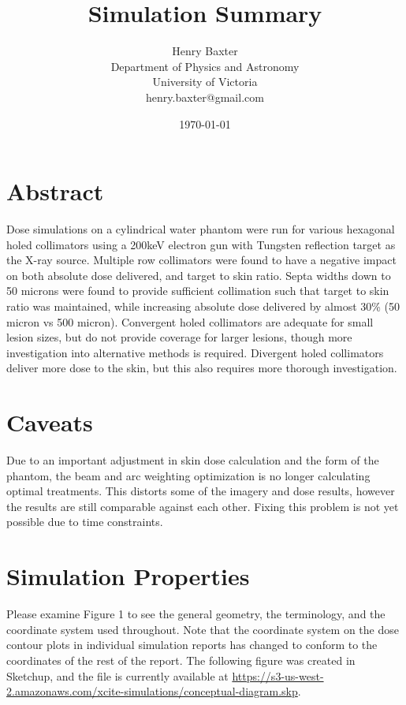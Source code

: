 \documentclass[12pt]{article}
\title{Simulation Summary}
\author{
        Henry Baxter \\
                Department of Physics and Astronomy\\
        University of Victoria\\
        henry.baxter@gmail.com
}
\date{\today}
\begin{document}
\maketitle

\section*{Abstract}

Dose simulations on a cylindrical water phantom were run for various hexagonal holed collimators using a 200keV electron gun with Tungsten reflection target as the X-ray source. Multiple row collimators were found to have a negative impact on both absolute dose delivered, and target to skin ratio. Septa widths down to 50 microns were found to provide sufficient collimation such that target to skin ratio was maintained, while increasing absolute dose delivered by almost 30\% (50 micron vs 500 micron). Convergent holed collimators are adequate for small lesion sizes, but do not provide coverage for larger lesions, though more investigation into alternative methods is required. Divergent holed collimators deliver more dose to the skin, but this also requires more thorough investigation.


\section*{Caveats}
Due to an important adjustment in skin dose calculation and the form of the phantom, the beam and arc weighting optimization is no longer calculating optimal treatments.  This distorts some of the imagery and dose results, however the results are still comparable against each other. Fixing this problem is not yet possible due to time constraints.


\section*{Simulation Properties}

Please examine Figure 1 to see the general geometry, the terminology, and the coordinate system used throughout. Note that the coordinate system on the dose contour plots in individual simulation reports has changed to conform to the coordinates of the rest of the report. The following figure was created in Sketchup, and the file is currently available at \url{https://s3-us-west-2.amazonaws.com/xcite-simulations/conceptual-diagram.skp}.
\end{document}
